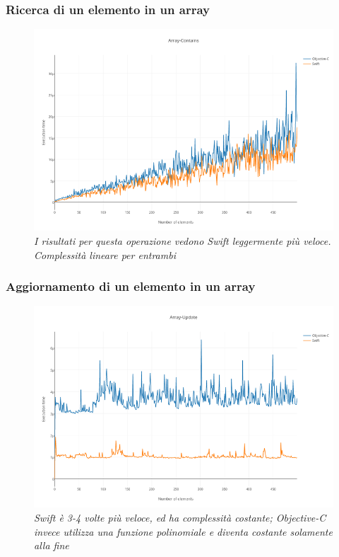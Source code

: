 \subsubsection{Ricerca di un elemento in un array}
\begin{figure}[H]
      \centering
      \includegraphics[scale=0.50]{immagini/array_contains.png}
            \vspace{0.8cm}
            \caption{\textit{I risultati per questa operazione vedono Swift leggermente più veloce. Complessità lineare per entrambi}}
\end{figure}
\subsubsection{Aggiornamento di un elemento in un array}
\begin{figure}[H]
      \centering
      \includegraphics[scale=0.50]{immagini/array_update.png}
            \vspace{0.8cm}
            \caption{\textit{Swift è 3-4 volte più veloce, ed ha complessità costante; Objective-C invece utilizza una funzione polinomiale e diventa costante solamente alla fine}}
\end{figure}
